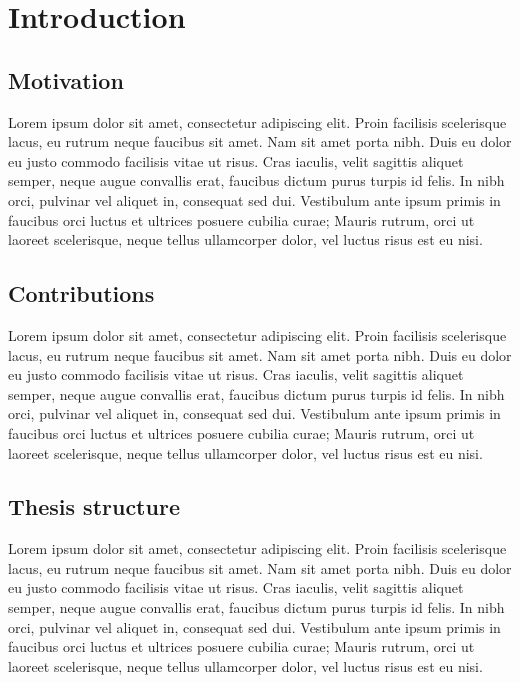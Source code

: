 \chapter{Introduction}

\section{Motivation}
Lorem ipsum dolor sit amet, consectetur adipiscing elit. Proin facilisis scelerisque lacus, eu rutrum neque faucibus sit amet. Nam sit amet porta nibh. Duis eu dolor eu justo commodo facilisis vitae ut risus. Cras iaculis, velit sagittis aliquet semper, neque augue convallis erat, faucibus dictum purus turpis id felis. In nibh orci, pulvinar vel aliquet in, consequat sed dui. Vestibulum ante ipsum primis in faucibus orci luctus et ultrices posuere cubilia curae; Mauris rutrum, orci ut laoreet scelerisque, neque tellus ullamcorper dolor, vel luctus risus est eu nisi.


\section{Contributions\label{sec:contributions}}

Lorem ipsum dolor sit amet, consectetur adipiscing elit. Proin facilisis scelerisque lacus, eu rutrum neque faucibus sit amet. Nam sit amet porta nibh. Duis eu dolor eu justo commodo facilisis vitae ut risus. Cras iaculis, velit sagittis aliquet semper, neque augue convallis erat, faucibus dictum purus turpis id felis. In nibh orci, pulvinar vel aliquet in, consequat sed dui. Vestibulum ante ipsum primis in faucibus orci luctus et ultrices posuere cubilia curae; Mauris rutrum, orci ut laoreet scelerisque, neque tellus ullamcorper dolor, vel luctus risus est eu nisi.



\section{Thesis structure}

Lorem ipsum dolor sit amet, consectetur adipiscing elit. Proin facilisis scelerisque lacus, eu rutrum neque faucibus sit amet. Nam sit amet porta nibh. Duis eu dolor eu justo commodo facilisis vitae ut risus. Cras iaculis, velit sagittis aliquet semper, neque augue convallis erat, faucibus dictum purus turpis id felis. In nibh orci, pulvinar vel aliquet in, consequat sed dui. Vestibulum ante ipsum primis in faucibus orci luctus et ultrices posuere cubilia curae; Mauris rutrum, orci ut laoreet scelerisque, neque tellus ullamcorper dolor, vel luctus risus est eu nisi.

